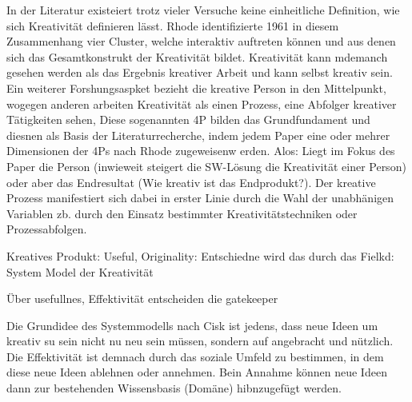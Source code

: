 In der Literatur existeiert trotz vieler Versuche keine einheitliche Definition, wie sich Kreativität definieren lässt. Rhode identifizierte 1961 in diesem Zusammenhang vier Cluster, welche interaktiv auftreten können und aus denen sich das Gesamtkonstrukt der Kreativität bildet. Kreativität kann mdemanch gesehen werden als das Ergebnis kreativer Arbeit und kann selbst kreativ sein. Ein weiterer Forshungsaspket bezieht die kreative Person in den Mittelpunkt, wogegen anderen arbeiten Kreativität als einen Prozess, eine Abfolger kreativer Tätigkeiten sehen,
Diese sogenannten 4P bilden das Grundfundament und diesnen als Basis der Literaturrecherche, indem jedem Paper eine oder mehrer Dimensionen der 4Ps nach Rhode zugeweisenw erden. Alos: Liegt im Fokus des Paper die Person (inwieweit steigert die SW-Lösung die Kreativität einer Person) oder aber das Endresultat (Wie kreativ ist das Endprodukt?). Der kreative Prozess manifestiert sich dabei in erster Linie durch die Wahl der unabhänigen Variablen zb. durch den Einsatz bestimmter Kreativitätstechniken oder Prozessabfolgen.

Kreatives Produkt: Useful, Originality: Entschiedne wird das durch das Fielkd: System Model der Kreativität

Über usefullnes, Effektivität entscheiden die gatekeeper

Die Grundidee des Systemmodells nach Cisk ist jedens, dass neue Ideen um kreativ su sein nicht nu neu sein müssen, sondern auf angebracht und nützlich. Die Effektivität ist demnach durch das soziale Umfeld zu bestimmen, in dem diese neue Ideen ablehnen oder annehmen. Bein Annahme können neue Ideen dann zur bestehenden Wissensbasis (Domäne) hibnzugefügt werden.
